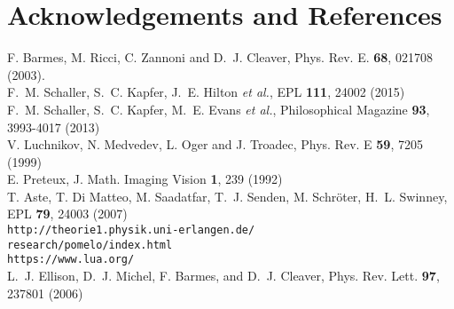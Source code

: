 \documentclass[epj,onecolumn]{webofc}
\begin{document}
\section*{Acknowledgements and References}
%
% 
%
%
\begin{thebibliography}{}
%
%
F. Barmes, M. Ricci, C. Zannoni and D.~J. Cleaver, Phys. Rev. E. \textbf{68}, 021708 (2003).\\

    F.~M. Schaller, S.~C. Kapfer, J.~E. Hilton \textit{et al.}, EPL \textbf{111}, 24002 (2015)\\

    F.~M. Schaller, S.~C. Kapfer, M.~E. Evans \textit{et al.}, Philosophical Magazine \textbf{93}, 3993-4017 (2013)\\

    V. Luchnikov, N. Medvedev, L. Oger and J. Troadec, Phys. Rev. E \textbf{59}, 7205 (1999)\\

    E. Preteux, J. Math. Imaging Vision \textbf{1}, 239 (1992)\\

T. Aste, T. Di Matteo, M. Saadatfar, T.~J. Senden, M. Schröter, H.~L. Swinney, EPL \textbf{79}, 24003 (2007)\\

\verb~http://theorie1.physik.uni-erlangen.de/~\\\verb~research/pomelo/index.html~\\

\verb~https://www.lua.org/~\\

L.~J. Ellison, D.~J. Michel, F. Barmes, and D.~J. Cleaver, Phys. Rev. Lett. \textbf{97}, 237801 (2006)\\
\end{thebibliography}
\end{document}
